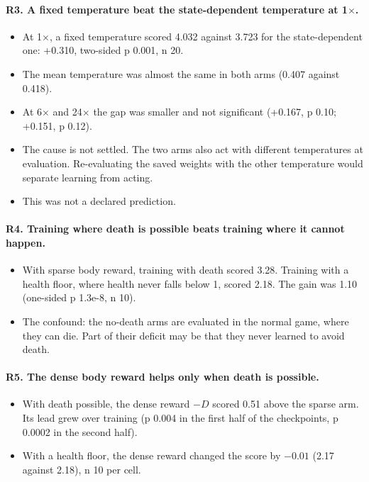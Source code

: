 \documentclass[11pt]{article}
\begin{document}
\paragraph{R3. A fixed temperature beat the state-dependent temperature at 1$\times$.}

\begin{itemize}
\item At 1$\times$, a fixed temperature scored 4.032 against 3.723 for the state-dependent one: +0.310, two-sided p 0.001, n 20.
\item The mean temperature was almost the same in both arms (0.407 against 0.418).
\item At 6$\times$ and 24$\times$ the gap was smaller and not significant (+0.167, p 0.10; +0.151, p 0.12).
\item The cause is not settled. The two arms also act with different temperatures at evaluation. Re-evaluating the saved weights with the other temperature would separate learning from acting.
\item This was not a declared prediction.
\end{itemize}

\paragraph{R4. Training where death is possible beats training where it cannot happen.}

\begin{itemize}
\item With sparse body reward, training with death scored 3.28. Training with a health floor, where health never falls below 1, scored 2.18. The gain was 1.10 (one-sided p 1.3e-8, n 10).
\item The confound: the no-death arms are evaluated in the normal game, where they can die. Part of their deficit may be that they never learned to avoid death.
\end{itemize}

\paragraph{R5. The dense body reward helps only when death is possible.}

\begin{itemize}
\item With death possible, the dense reward $-D$ scored 0.51 above the sparse arm. Its lead grew over training (p 0.004 in the first half of the checkpoints, p 0.0002 in the second half).
\item With a health floor, the dense reward changed the score by $-0.01$ (2.17 against 2.18), n 10 per cell.
\end{itemize}
\end{document}
